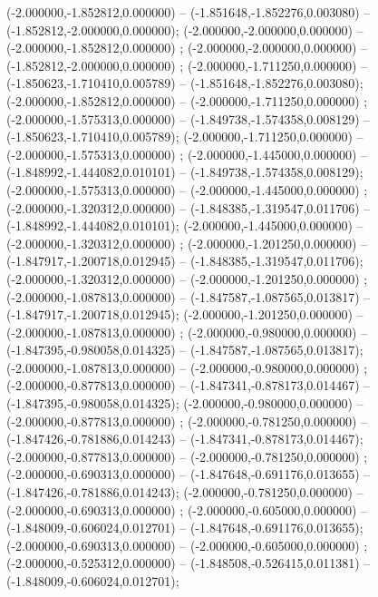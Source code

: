  (-2.000000,-1.852812,0.000000) -- (-1.851648,-1.852276,0.003080) -- (-1.852812,-2.000000,0.000000);
 (-2.000000,-2.000000,0.000000) -- (-2.000000,-1.852812,0.000000) ;
 (-2.000000,-2.000000,0.000000) -- (-1.852812,-2.000000,0.000000) ;
 (-2.000000,-1.711250,0.000000) -- (-1.850623,-1.710410,0.005789) -- (-1.851648,-1.852276,0.003080);
 (-2.000000,-1.852812,0.000000) -- (-2.000000,-1.711250,0.000000) ;
 (-2.000000,-1.575313,0.000000) -- (-1.849738,-1.574358,0.008129) -- (-1.850623,-1.710410,0.005789);
 (-2.000000,-1.711250,0.000000) -- (-2.000000,-1.575313,0.000000) ;
 (-2.000000,-1.445000,0.000000) -- (-1.848992,-1.444082,0.010101) -- (-1.849738,-1.574358,0.008129);
 (-2.000000,-1.575313,0.000000) -- (-2.000000,-1.445000,0.000000) ;
 (-2.000000,-1.320312,0.000000) -- (-1.848385,-1.319547,0.011706) -- (-1.848992,-1.444082,0.010101);
 (-2.000000,-1.445000,0.000000) -- (-2.000000,-1.320312,0.000000) ;
 (-2.000000,-1.201250,0.000000) -- (-1.847917,-1.200718,0.012945) -- (-1.848385,-1.319547,0.011706);
 (-2.000000,-1.320312,0.000000) -- (-2.000000,-1.201250,0.000000) ;
 (-2.000000,-1.087813,0.000000) -- (-1.847587,-1.087565,0.013817) -- (-1.847917,-1.200718,0.012945);
 (-2.000000,-1.201250,0.000000) -- (-2.000000,-1.087813,0.000000) ;
 (-2.000000,-0.980000,0.000000) -- (-1.847395,-0.980058,0.014325) -- (-1.847587,-1.087565,0.013817);
 (-2.000000,-1.087813,0.000000) -- (-2.000000,-0.980000,0.000000) ;
 (-2.000000,-0.877813,0.000000) -- (-1.847341,-0.878173,0.014467) -- (-1.847395,-0.980058,0.014325);
 (-2.000000,-0.980000,0.000000) -- (-2.000000,-0.877813,0.000000) ;
 (-2.000000,-0.781250,0.000000) -- (-1.847426,-0.781886,0.014243) -- (-1.847341,-0.878173,0.014467);
 (-2.000000,-0.877813,0.000000) -- (-2.000000,-0.781250,0.000000) ;
 (-2.000000,-0.690313,0.000000) -- (-1.847648,-0.691176,0.013655) -- (-1.847426,-0.781886,0.014243);
 (-2.000000,-0.781250,0.000000) -- (-2.000000,-0.690313,0.000000) ;
 (-2.000000,-0.605000,0.000000) -- (-1.848009,-0.606024,0.012701) -- (-1.847648,-0.691176,0.013655);
 (-2.000000,-0.690313,0.000000) -- (-2.000000,-0.605000,0.000000) ;
 (-2.000000,-0.525312,0.000000) -- (-1.848508,-0.526415,0.011381) -- (-1.848009,-0.606024,0.012701);
